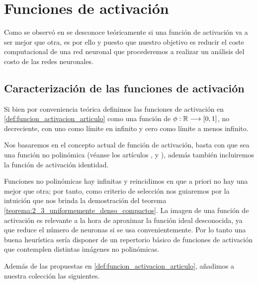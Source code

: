 
\chapter{Funciones de activación}

Como se observó en 
se desconoce teóricamente si una función de activación va a ser 
mejor que otra, es por ello y puesto que nuestro objetivo 
es reducir el coste computacional de una red neuronal
que procederemos a realizar un análisis del costo de las redes neuronales. 


\section{Caracterización de las funciones de activación}  

Si bien por conveniencia teórica definimos las funciones de activación en \ref{def:funcion_activacion_articulo}
como una función de $\phi:\mathbb{R} \longrightarrow [0,1]$, no 
decreciente, con uno como límite en infinito y cero como límite a 
menos infinito. 

Nos basaremos en el concepto actual de función de activación,
basta con que sea una función no polinómica
(véanse  los artículos \cite{DBLP:journals/corr/SonodaM15}, \cite{modern-trainable-activation-functions} y \cite{FUNAHASHI1989183}),
además también incluiremos la función de activación identidad.

Funciones no polinómicas hay infinitas y reincidimos en que a priori no hay una mejor que otra; por tanto, como criterio de selección nos guiaremos por la intuición que nos brinda la demostración del teorema \ref{teorema:2_3_uniformemente_denso_compactos}.
  La imagen de una función de activación es relevante a la hora de aproximar la función ideal desconocida, ya que reduce el número 
  de neuronas si se usa convenientemente.  
Por lo tanto una buena heurística sería disponer de un repertorio básico de funciones de activación que contemplen distintas imágenes no polinómicas. 

Además de las propuestas en \ref{def:funcion_activacion_articulo}, 
añadimos a nuestra colección las siguientes. 

